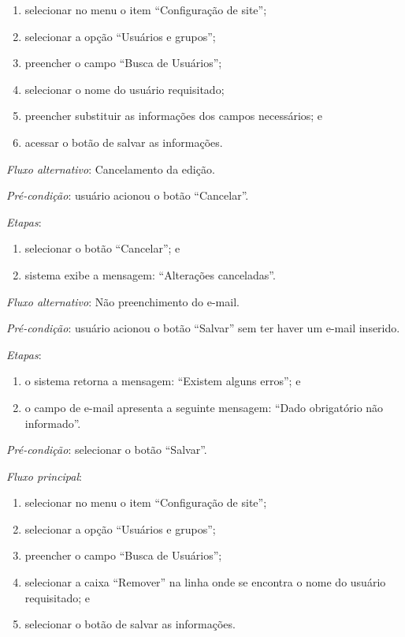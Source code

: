 \begin{enumerate}
    \item selecionar no menu o item ``Configuração de site'';
    \item selecionar a opção ``Usuários e grupos'';
    \item preencher o campo ``Busca de Usuários'';
    \item selecionar o nome do usuário requisitado;
    \item preencher substituir as informações dos campos necessários; e
    \item acessar o botão de salvar as informações.
\end{enumerate}

\noindent \textit{Fluxo alternativo}: Cancelamento da edição.

\noindent \textit{Pré-condição}: usuário acionou o botão ``Cancelar''.

\noindent \textit{Etapas}:

\begin{enumerate}
    \item selecionar o botão ``Cancelar''; e
    \item sistema exibe a mensagem: ``Alterações canceladas''.
\end{enumerate}

\noindent \textit{Fluxo alternativo}: Não preenchimento do e-mail.

\noindent \textit{Pré-condição}: usuário acionou o botão ``Salvar'' sem ter haver um e-mail inserido.

\noindent \textit{Etapas}:

\begin{enumerate}
    \item o sistema retorna a mensagem: ``Existem alguns erros''; e
    \item o campo de e-mail apresenta a seguinte mensagem: ``Dado obrigatório não informado''.
\end{enumerate}



\vspace{0.7cm}

\noindent \textit{Pré-condição}: selecionar o botão ``Salvar''.

\noindent \textit{Fluxo principal}:

\begin{enumerate}
    \item selecionar no menu o item ``Configuração de site'';
    \item selecionar a opção ``Usuários e grupos'';
    \item preencher o campo ``Busca de Usuários'';
    \item selecionar a caixa ``Remover'' na linha onde se encontra o nome do usuário requisitado; e
    \item selecionar o botão de salvar as informações.
\end{enumerate}

